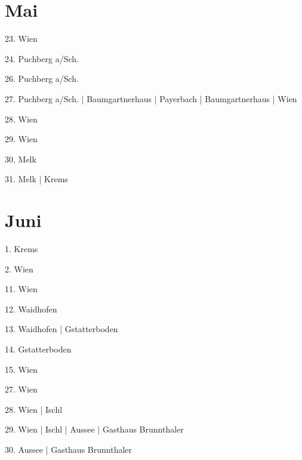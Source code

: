 \documentclass[twoside=false,titlepage=false,open=any, parskip=never, fontsize=10pt, headings=small, chapterprefix=false, appendixprefix=false, DIV=15]{scrbook}
\begin{document}
\begin{multicols}{3}
            \section*{Mai}
            23. Wien\par
            24. Puchberg a/Sch.\par
            26. Puchberg a/Sch.\par
            27. Puchberg a/Sch. | Baumgartnerhaus | Payerbach | Baumgartnerhaus | Wien\par
            28. Wien\par
            29. Wien\par
            30. Melk\par
            31. Melk | Krems\par
            \section*{Juni}
            1. Krems\par
            2. Wien\par
            11. Wien\par
            12. Waidhofen\par
            13. Waidhofen | Gstatterboden\par
            14. Gstatterboden\par
            15. Wien\par
            27. Wien\par
            28. Wien | Ischl\par
            29. Wien | Ischl | Aussee | Gasthaus Brunnthaler\par
            30. Aussee | Gasthaus Brunnthaler\par

\end{multicols}
\end{document}
